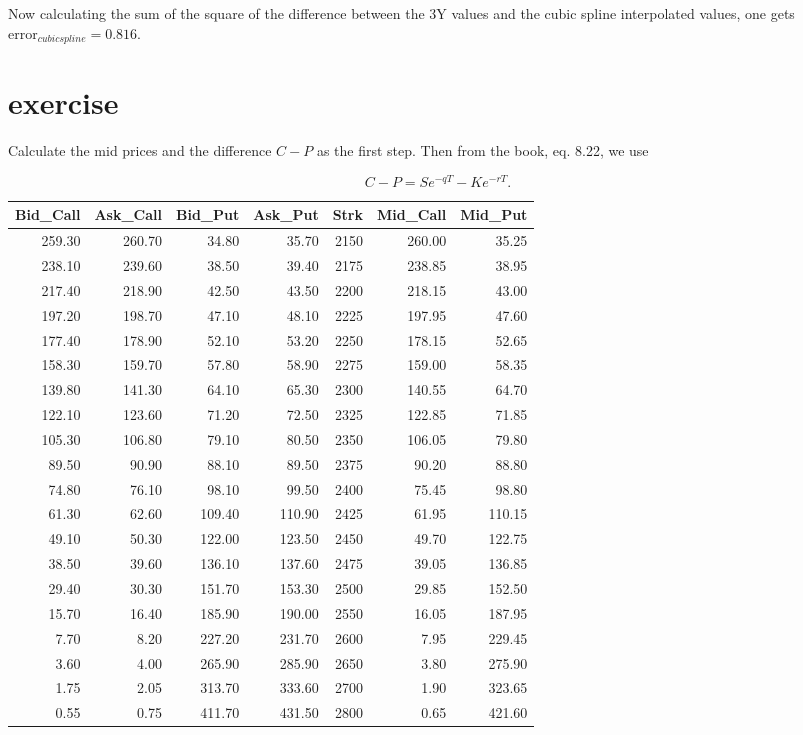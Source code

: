 \documentclass{article}
\begin{document}
Now calculating the sum of the square of the difference between
the 3Y values and the cubic spline interpolated values, one gets
$\text{error}_{cubic spline} = 0.816$.

\section{exercise}
Calculate the mid prices and the difference $C-P$ as the first step.
Then from the book, eq. 8.22, we use

\[C - P = S{e^{ - qT}} - K{e^{ - rT}}.\]

\begin{tabular}{rrrrrrr}
    \toprule
    Bid\_Call & Ask\_Call & Bid\_Put & Ask\_Put & Strk & Mid\_Call & Mid\_Put \\
    \midrule
    259.30    & 260.70    & 34.80    & 35.70    & 2150 & 260.00    & 35.25    \\
    238.10    & 239.60    & 38.50    & 39.40    & 2175 & 238.85    & 38.95    \\
    217.40    & 218.90    & 42.50    & 43.50    & 2200 & 218.15    & 43.00    \\
    197.20    & 198.70    & 47.10    & 48.10    & 2225 & 197.95    & 47.60    \\
    177.40    & 178.90    & 52.10    & 53.20    & 2250 & 178.15    & 52.65    \\
    158.30    & 159.70    & 57.80    & 58.90    & 2275 & 159.00    & 58.35    \\
    139.80    & 141.30    & 64.10    & 65.30    & 2300 & 140.55    & 64.70    \\
    122.10    & 123.60    & 71.20    & 72.50    & 2325 & 122.85    & 71.85    \\
    105.30    & 106.80    & 79.10    & 80.50    & 2350 & 106.05    & 79.80    \\
    89.50     & 90.90     & 88.10    & 89.50    & 2375 & 90.20     & 88.80    \\
    74.80     & 76.10     & 98.10    & 99.50    & 2400 & 75.45     & 98.80    \\
    61.30     & 62.60     & 109.40   & 110.90   & 2425 & 61.95     & 110.15   \\
    49.10     & 50.30     & 122.00   & 123.50   & 2450 & 49.70     & 122.75   \\
    38.50     & 39.60     & 136.10   & 137.60   & 2475 & 39.05     & 136.85   \\
    29.40     & 30.30     & 151.70   & 153.30   & 2500 & 29.85     & 152.50   \\
    15.70     & 16.40     & 185.90   & 190.00   & 2550 & 16.05     & 187.95   \\
    7.70      & 8.20      & 227.20   & 231.70   & 2600 & 7.95      & 229.45   \\
    3.60      & 4.00      & 265.90   & 285.90   & 2650 & 3.80      & 275.90   \\
    1.75      & 2.05      & 313.70   & 333.60   & 2700 & 1.90      & 323.65   \\
    0.55      & 0.75      & 411.70   & 431.50   & 2800 & 0.65      & 421.60   \\
    \bottomrule
\end{tabular}
\end{document}
